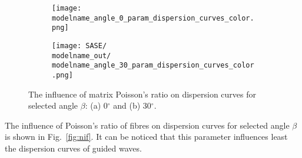 \documentclass[preprint,12pt]{elsarticle}
\begin{document}
\begin{figure} [h!]
	\centering
	\newcommand{\modelname}{SASE6_plain_weave}
	\begin{subfigure}[b]{0.49\textwidth}
		\centering
		\texttt{[image: \\modelname\_angle\_0\_param\_dispersion\_curves\_color.png]}
		\caption{}
		\label{fig:nim0}
	\end{subfigure}
	\hfill
	\begin{subfigure}[b]{0.49\textwidth}
		\centering
		\texttt{[image: SASE/\\modelname\_out/\\modelname\_angle\_30\_param\_dispersion\_curves\_color.png]}
		\caption{}
		\label{fig:nim30}
	\end{subfigure}
	\caption{The influence of matrix Poisson's ratio on dispersion curves for selected angle $\beta$: (a) 0$^{\circ}$ and (b) 30$^{\circ}$.}
	\label{fig:nim}
\end{figure}

The influence of Poisson's ratio of fibres  on dispersion curves for selected angle $\beta$ is shown in Fig.~\ref{fig:nif}. It can be noticed that this parameter influences least the dispersion curves of guided waves.
\end{document}
